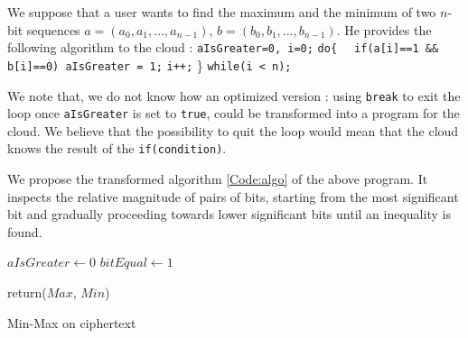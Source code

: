 \documentclass{acm_proc_article-sp}
\begin{document}
We suppose that a user wants to find the maximum and the minimum of two $n$-bit sequences $a = (a_0,a_1,\ldots, a_{n-1})$, $b=(b_0,b_1,\ldots, b_{n-1})$. He provides the following algorithm to the cloud :
\newline \phantom{x} \texttt{aIsGreater=0, i=0;}
\newline \phantom{x} \texttt{do\{ }
\newline \phantom{x} \hspace{6ex} \texttt{ if(a[i]==1 \&\& b[i]==0) 
\newline \phantom{x} \hspace{14ex}aIsGreater = 1;}
\newline \phantom{x} \hspace{7ex} \texttt{i++;} 
\newline   \phantom{x} \} \texttt{while(i < n);} 

We note that, we do not know how an optimized version :  using \texttt{break} to exit the loop once \texttt{aIsGreater} is set to \texttt{true}, could be transformed into a program for the cloud. We believe that the possibility to quit the loop would mean that the cloud knows the result of the \texttt{if(condition)}. 

We propose the transformed algorithm \autoref{Code:algo} of the above program. It inspects the relative magnitude of pairs of bits, starting from the most significant bit and gradually proceeding towards lower significant bits until an inequality is found.
 


\linesnumbered

\begin{algorithm}[H]

\SetVline



 $aIsGreater \leftarrow 0$\;
 $bitEqual \leftarrow 1$\;
	


return($Max$, $Min$)

 \caption{Min-Max on ciphertext \label{Code:algo}}


\end{algorithm}
\end{document}
